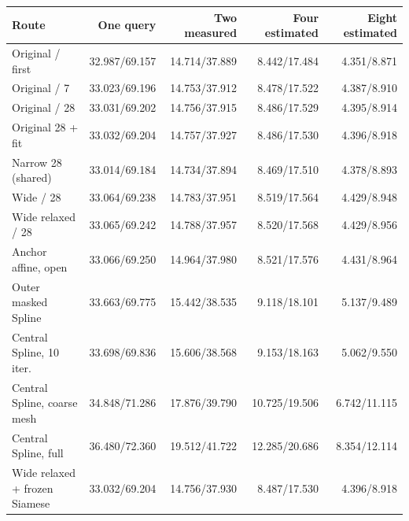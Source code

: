 \begin{tabular}{@{}lrrrr@{}}
\toprule
Route & One query & Two measured & Four estimated & Eight estimated \\
\midrule
Original / first & 32.987/69.157 & 14.714/37.889 & 8.442/17.484 & 4.351/8.871 \\
Original / 7 & 33.023/69.196 & 14.753/37.912 & 8.478/17.522 & 4.387/8.910 \\
Original / 28 & 33.031/69.202 & 14.756/37.915 & 8.486/17.529 & 4.395/8.914 \\
Original 28 + fit & 33.032/69.204 & 14.757/37.927 & 8.486/17.530 & 4.396/8.918 \\
Narrow 28 (shared) & 33.014/69.184 & 14.734/37.894 & 8.469/17.510 & 4.378/8.893 \\
Wide / 28 & 33.064/69.238 & 14.783/37.951 & 8.519/17.564 & 4.429/8.948 \\
Wide relaxed / 28 & 33.065/69.242 & 14.788/37.957 & 8.520/17.568 & 4.429/8.956 \\
Anchor affine, open & 33.066/69.250 & 14.964/37.980 & 8.521/17.576 & 4.431/8.964 \\
Outer masked Spline & 33.663/69.775 & 15.442/38.535 & 9.118/18.101 & 5.137/9.489 \\
Central Spline, 10 iter. & 33.698/69.836 & 15.606/38.568 & 9.153/18.163 & 5.062/9.550 \\
Central Spline, coarse mesh & 34.848/71.286 & 17.876/39.790 & 10.725/19.506 & 6.742/11.115 \\
Central Spline, full & 36.480/72.360 & 19.512/41.722 & 12.285/20.686 & 8.354/12.114 \\
Wide relaxed + frozen Siamese & 33.032/69.204 & 14.756/37.930 & 8.487/17.530 & 4.396/8.918 \\
\bottomrule
\end{tabular}
